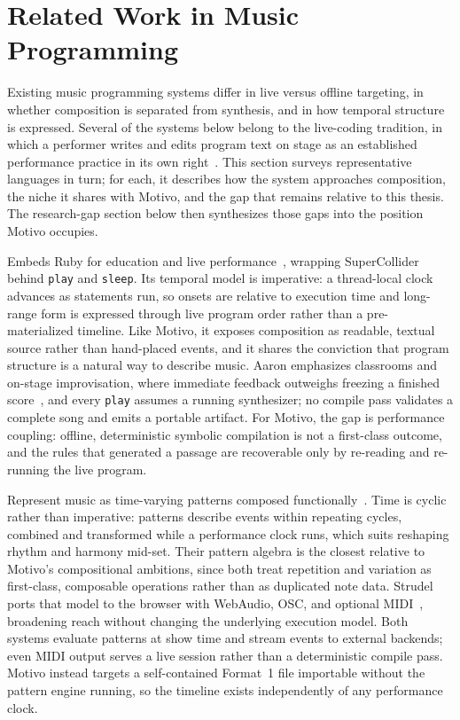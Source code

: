 \section{Related Work in Music Programming}\label{sec:related-work}

Existing music programming systems differ in live versus offline targeting, in whether composition is separated from
synthesis, and in how temporal structure is expressed.
Several of the systems below belong to the live-coding tradition, in which a performer writes and edits program text
on stage as an established performance practice in its own right~\cite{Collins_McLean_Rohrhuber_Ward_2003}.
This section surveys representative languages in turn; for each, it describes how the system approaches composition,
the niche it shares with Motivo, and the gap that remains relative to this thesis.
The research-gap section below then synthesizes those gaps into the position Motivo occupies.

 Embeds Ruby for education and live performance~\cite{Aaron_Blackwell_2013,Aaron_2016}, wrapping
SuperCollider behind \texttt{play} and \texttt{sleep}.
Its temporal model is imperative: a thread-local clock advances as statements run, so onsets are relative to execution
time and long-range form is expressed through live program order rather than a pre-materialized timeline.
Like Motivo, it exposes composition as readable, textual source rather than hand-placed events, and it shares the
conviction that program structure is a natural way to describe music.
Aaron emphasizes classrooms and on-stage improvisation, where immediate feedback outweighs freezing a finished
score~\cite{Aaron_2016}, and every \texttt{play} assumes a running synthesizer; no compile pass validates a complete
song and emits a portable artifact.
For Motivo, the gap is performance coupling: offline, deterministic symbolic compilation is not a first-class outcome,
and the rules that generated a passage are recoverable only by re-reading and re-running the live program.

 Represent music as time-varying patterns composed
functionally~\cite{McLean_Wiggins_2010}.
Time is cyclic rather than imperative: patterns describe events within repeating cycles, combined and transformed
while a performance clock runs, which suits reshaping rhythm and harmony mid-set.
Their pattern algebra is the closest relative to Motivo's compositional ambitions, since both treat repetition and
variation as first-class, composable operations rather than as duplicated note data.
Strudel ports that model to the browser with WebAudio, OSC, and optional MIDI~\cite{Roos_McLean_2023}, broadening reach
without changing the underlying execution model.
Both systems evaluate patterns at show time and stream events to external backends; even MIDI output serves a live
session rather than a deterministic compile pass.
Motivo instead targets a self-contained Format~1 file importable without the pattern engine running, so the timeline
exists independently of any performance clock.

